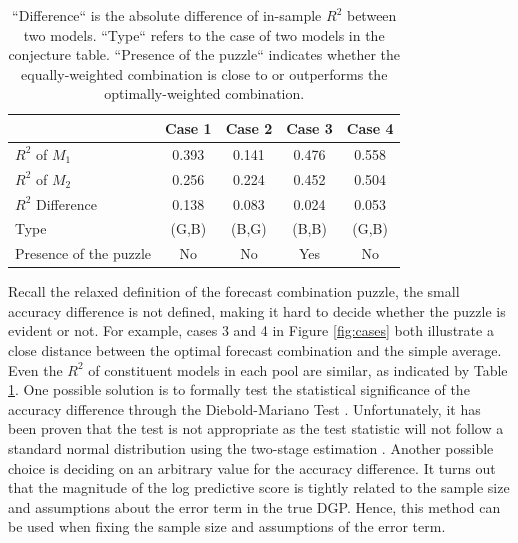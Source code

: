 \documentclass{monashthesis}
\begin{document}
\begin{table}[ht]
  \centering
    \begin{tabular}{l|cccc}
    \toprule
                              &    Case 1    &    Case 2   &    Case 3    &    Case 4   \\  
    \midrule
    $R^2$ of $M_1$            &    0.393     &    0.141    &    0.476     &    0.558    \\
    $R^2$ of $M_2$            &    0.256     &    0.224    &    0.452     &    0.504    \\
    $R^2$ Difference          &    0.138     &    0.083    &    0.024     &    0.053    \\
    Type                      &    (G,B)     &    (B,G)    &    (B,B)     &    (G,B)    \\
    Presence of the puzzle    &     No       &     No      &     Yes      &     No     \\
    \bottomrule
    \end{tabular}
    \caption{``Difference`` is the absolute difference of in-sample $R^2$ between two models. ``Type`` refers to the case of two models in the conjecture table. ``Presence of the puzzle`` indicates whether the equally-weighted combination is close to or outperforms the optimally-weighted combination.}
  \label{tab:cases}
\end{table}

Recall the relaxed definition of the forecast combination puzzle, the small accuracy difference is not defined, making it hard to decide whether the puzzle is evident or not. For example, cases 3 and 4 in Figure \ref{fig:cases} both illustrate a close distance between the optimal forecast combination and the simple average. Even the \(R^2\) of constituent models in each pool are similar, as indicated by Table \ref{tab:cases}. One possible solution is to formally test the statistical significance of the accuracy difference through the Diebold-Mariano Test \autocite{D15}. Unfortunately, it has been proven that the test is not appropriate as the test statistic will not follow a standard normal distribution using the two-stage estimation \autocite{FZMP23}. Another possible choice is deciding on an arbitrary value for the accuracy difference. It turns out that the magnitude of the log predictive score is tightly related to the sample size and assumptions about the error term in the true DGP. Hence, this method can be used when fixing the sample size and assumptions of the error term.
\end{document}
